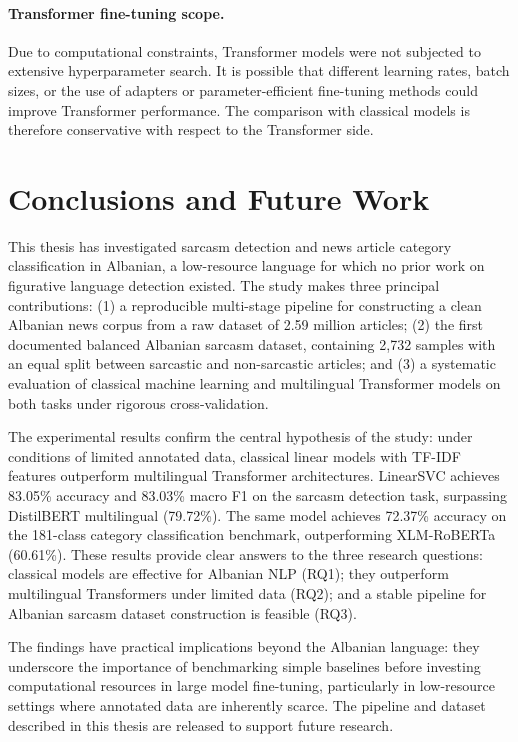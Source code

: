\documentclass[12pt,a4paper]{article}
\begin{document}
\paragraph{Transformer fine-tuning scope.}
Due to computational constraints, Transformer models were not subjected to extensive hyperparameter search. It is possible that different learning rates, batch sizes, or the use of adapters or parameter-efficient fine-tuning methods could improve Transformer performance. The comparison with classical models is therefore conservative with respect to the Transformer side.

\newpage
\section{Conclusions and Future Work}
\label{sec:conclusions}

This thesis has investigated sarcasm detection and news article category classification in Albanian, a low-resource language for which no prior work on figurative language detection existed. The study makes three principal contributions: (1) a reproducible multi-stage pipeline for constructing a clean Albanian news corpus from a raw dataset of 2.59 million articles; (2) the first documented balanced Albanian sarcasm dataset, containing 2,732 samples with an equal split between sarcastic and non-sarcastic articles; and (3) a systematic evaluation of classical machine learning and multilingual Transformer models on both tasks under rigorous cross-validation.

The experimental results confirm the central hypothesis of the study: under conditions of limited annotated data, classical linear models with TF-IDF features outperform multilingual Transformer architectures. LinearSVC achieves 83.05\% accuracy and 83.03\% macro F1 on the sarcasm detection task, surpassing DistilBERT multilingual (79.72\%). The same model achieves 72.37\% accuracy on the 181-class category classification benchmark, outperforming XLM-RoBERTa (60.61\%). These results provide clear answers to the three research questions: classical models are effective for Albanian NLP (RQ1); they outperform multilingual Transformers under limited data (RQ2); and a stable pipeline for Albanian sarcasm dataset construction is feasible (RQ3).

The findings have practical implications beyond the Albanian language: they underscore the importance of benchmarking simple baselines before investing computational resources in large model fine-tuning, particularly in low-resource settings where annotated data are inherently scarce. The pipeline and dataset described in this thesis are released to support future research.
\end{document}
